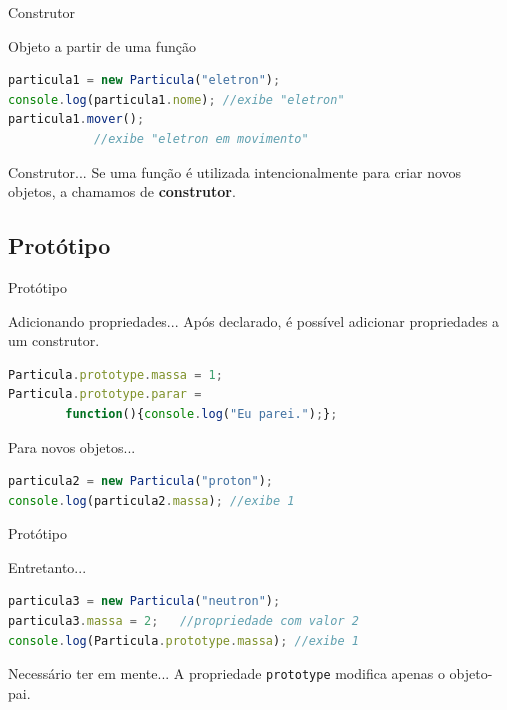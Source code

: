 \documentclass[xcolor=dvipsnames,table]{beamer}
\begin{document}
\begin{frame}[fragile]{Construtor}
	\begin{block}{Objeto a partir de uma função}
		\begin{lstlisting}[language=JavaScript]
particula1 = new Particula("eletron");
console.log(particula1.nome); //exibe "eletron"
particula1.mover();	
			//exibe "eletron em movimento"
\end{lstlisting}	
	\end{block} \pause
	\begin{block}{Construtor...}
		Se uma função é utilizada intencionalmente para criar novos objetos, a chamamos de {\bf construtor}.
	\end{block}
\end{frame}

\subsection{Protótipo}
\begin{frame}[fragile]{Protótipo}
	\begin{block}{Adicionando propriedades...}
		Após declarado, é possível adicionar propriedades a um construtor.
		\begin{lstlisting}[language=JavaScript]
Particula.prototype.massa = 1;
Particula.prototype.parar = 
		function(){console.log("Eu parei.");};
\end{lstlisting}	
	\end{block} \pause
	\begin{block}{Para novos objetos...}
		\begin{lstlisting}[language=JavaScript]
particula2 = new Particula("proton");
console.log(particula2.massa); //exibe 1
\end{lstlisting}	
	\end{block}
\end{frame}

\begin{frame}[fragile]{Protótipo}
	\begin{block}{Entretanto...}
		\begin{lstlisting}[language=JavaScript]
particula3 = new Particula("neutron");
particula3.massa = 2;	//propriedade com valor 2
console.log(Particula.prototype.massa);	//exibe 1
\end{lstlisting}	
	\end{block} 
	\begin{alertblock}{Necessário ter em mente...}
		A propriedade {\tt prototype} modifica apenas o objeto-pai.	
	\end{alertblock}
\end{frame}
\end{document}
